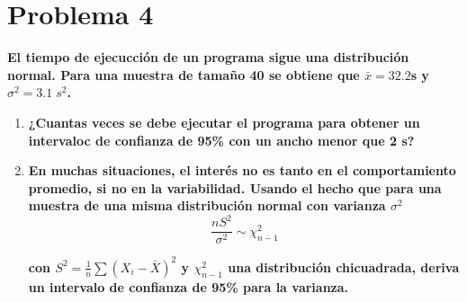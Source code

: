 \section*{Problema 4}

\textbf{El tiempo de ejecucción de un programa sigue una distribución normal. Para una muestra de tamaño 40 se obtiene que $\bar{x}=32.2$s y $\sigma^2=3.1\; s^2$.}

\begin{enumerate}
    \item \textbf{¿Cuantas veces se debe ejecutar el programa para obtener un intervaloc de confianza de 95\% con un ancho menor que 2 s?}
    \item \textbf{En muchas situaciones, el interés no es tanto en el comportamiento promedio, si no en la variabilidad. Usando el hecho que para una muestra de una misma distribución normal con varianza $\sigma^2$}
          \begin{equation*}
              \frac{nS^2}{\sigma^2} \sim \chi_{n-1}^2
          \end{equation*}

          \textbf{con $S^2 = \frac{1}{n}\sum (X_i-\bar{X})^2$ y $\chi_{n-1}^2$ una distribución chicuadrada, deriva un intervalo de confianza de 95\% para la varianza.}
\end{enumerate}